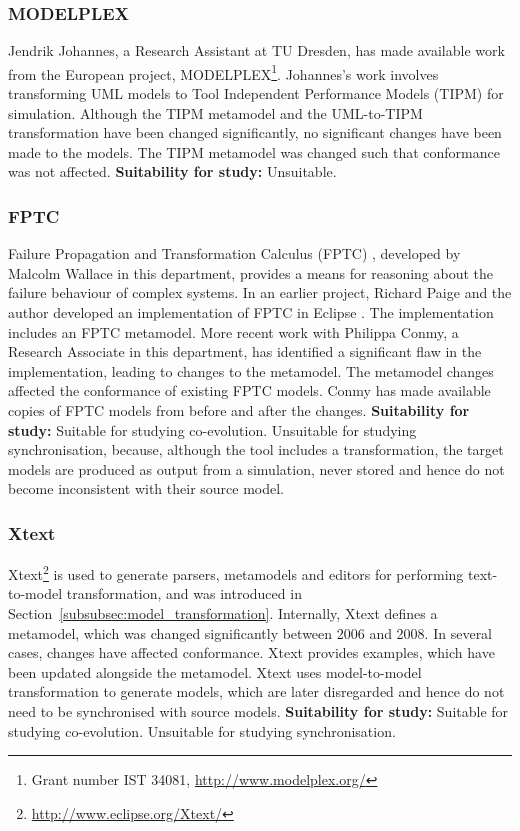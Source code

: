 \subsubsection{MODELPLEX}
Jendrik Johannes, a Research Assistant at TU Dresden, has made available work from the European project, MODELPLEX\footnote{Grant number IST 34081, \url{http://www.modelplex.org/}}. Johannes's work involves transforming UML models to Tool Independent Performance Models (TIPM) for simulation. Although the TIPM metamodel and the UML-to-TIPM transformation have been changed significantly, no significant changes have been made to the models. The TIPM metamodel was changed such that conformance was not affected. \textbf{Suitability for study:} Unsuitable.

\subsubsection{FPTC}
Failure Propagation and Transformation Calculus (FPTC) \cite{wallace05modular}, developed by Malcolm Wallace in this department, provides a means for reasoning about the failure behaviour of complex systems. In an earlier project, Richard Paige and the author developed an implementation of FPTC in Eclipse \cite{paige08fptc}. The implementation includes an FPTC metamodel. More recent work with Philippa Conmy, a Research Associate in this department, has identified a significant flaw in the implementation, leading to changes to the metamodel. The metamodel changes affected the conformance of existing FPTC models. Conmy has made available copies of FPTC models from before and after the changes. \textbf{Suitability for study:} Suitable for studying co-evolution. Unsuitable for studying synchronisation, because, although the tool includes a transformation, the target models are produced as output from a simulation, never stored and hence do not become inconsistent with their source model.

\subsubsection{Xtext}
Xtext\footnote{\url{http://www.eclipse.org/Xtext/}} is used to generate parsers, metamodels and editors for performing text-to-model transformation, and was introduced in Section~\ref{subsubsec:model_transformation}. Internally, Xtext defines a metamodel, which was changed significantly between 2006 and 2008. In several cases, changes have affected conformance. Xtext provides examples, which have been updated alongside the metamodel. Xtext uses model-to-model transformation to generate models, which are later disregarded and hence do not need to be synchronised with source models. \textbf{Suitability for study:} Suitable for studying co-evolution. Unsuitable for studying synchronisation.

